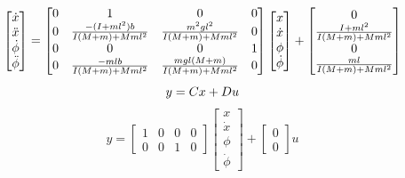 \documentclass[../cover.tex]{subfiles}
\begin{document}
            \begin{equation}
                \begin{bmatrix} \dot{x} \\ \ddot{x} \\ \dot{\phi} \\ \ddot{\phi} \end{bmatrix} = \begin{bmatrix} 0 & 1 & 0 & 0 \\ 0 & \frac{-(I+ml^2)b}{I(M+m)+Mml^2} & \frac{m^2gl^2}{I(M+m)+Mml^2} & 0 \\ 0 & 0 & 0 & 1 \\ 0 & \frac{-mlb}{I(M+m)+Mml^2} & \frac{mgl(M+m)}{I(M+m)+Mml^2} & 0\end{bmatrix} \begin{bmatrix} x \\ \dot{x} \\ \phi \\ \dot{\phi} \end{bmatrix} + \begin{bmatrix}
                        0 \\ \frac{I + ml^2}{I(M+m)+Mml^2} \\ 0 \\ \frac{ml}{I(M+m)+Mml^2} \end{bmatrix} \\[10pt]
            \end{equation}
            \begin{equation*}
                y = Cx+Du \\[5pt]
            \end{equation*}
            \begin{equation}
                y = \begin{bmatrix} 1 & 0 & 0 & 0 \\ 0 & 0 & 1 & 0 \end{bmatrix} \begin{bmatrix} x\\ \dot{x} \\ \phi \\ \dot{\phi}\end{bmatrix} + \begin{bmatrix}
                    0 \\ 0 \end{bmatrix} u
            \end{equation}
\end{document}

